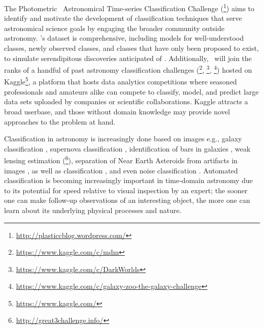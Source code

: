 The Photometric \lsst\ Astronomical Time-series Classification Challenge (\plasticc\footnote{\url{http://plasticcblog.wordpress.com/}}) aims to identify and motivate the development of classification techniques that serve astronomical science goals by engaging the broader community outside astronomy.
\plasticc's dataset is comprehensive, including models for well-understood classes, newly observed classes, and classes that have only been proposed to exist, to simulate serendipitous discoveries anticipated of \lsst.
Additionally, \plasticc\ will join the ranks of a handful of past astronomy classification challenges (\citet{kitching_gravitational_2011}\footnote{\url{https://www.kaggle.com/c/mdm}}, \citet{harvey_observing_2013}\footnote{\url{https://www.kaggle.com/c/DarkWorlds}},  \citet{dieleman_rotation-invariant_2015}\footnote{\url{https://www.kaggle.com/c/galaxy-zoo-the-galaxy-challenge}}) hosted on Kaggle\footnote{\url{https://www.kaggle.com/}}, a platform that hosts data analytics competitions where seasoned professionals and amateurs alike can compete to classify, model, and predict large data sets uploaded by companies or scientific collaborations.
Kaggle attracts a broad userbase, and those without domain knowledge may provide novel approaches to the problem at hand.

Classification in astronomy is increasingly done based on images e.g., galaxy classification \citep{hoyle_measuring_2016}, supernova classification \citep{cabrera-vives_deep-hits:_2017}, identification of bars in galaxies \citep{abraham_detection_2018}, weak lensing estimation (\citet{mandelbaum_third_2014}\footnote{\url{http://great3challenge.info/}}), separation of Near Earth Asteroids from artifacts in images \citep{morii_machine-learning_2016}, as well as  classification \citep{morii_machine-learning_2016, mahabal_deep-learnt_2017, zevin_gravity_2017}, and even noise classification \citep{zevin_gravity_2017, george_classification_2018}.
Automated classification \citep{djorgovski_towards_2011, djorgovski_flashes_2012, narayan_machine_2018, bloom_automating_2012} is becoming increasingly important in time-domain astronomy due to its potential for speed relative to visual inspection by an expert; the sooner one can make follow-up observations of an interesting object, the more one can learn about its underlying physical processes and nature.

